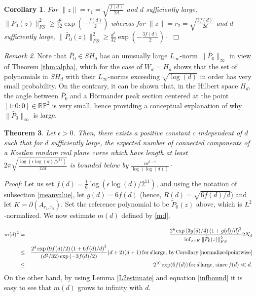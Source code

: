 \documentclass [11pt]{amsart}
\newtheorem {theorem}{Theorem}
\newtheorem {corollary}[theorem]{Corollary}
\theoremstyle{remark}
\newtheorem {remark}[theorem]{Remark}
\numberwithin{equation}{section}
\numberwithin{theorem}{section}
\begin{document}
\begin{corollary} \label{normalizedpointwise}
For $\displaystyle{\|z\|=r_{1}=\sqrt{\frac{f(d)}{2d}}}$ and $d$ sufficiently large,  
\( \displaystyle{\|\widetilde{P_{0}}(z)\|_{FS}^2 \geq \frac{d^{2}}{32}\exp\left(  -\frac{f(d)}{2}\right)}\)
whereas for $\displaystyle{ \|z\|=r_{2}= \sqrt{\frac{3f(d)}{2d}}}$  and $d$ sufficiently large, 
\(\displaystyle{ \|\widetilde{P_{0}}(z)\|_{FS}^2 \geq \frac{d^{2}}{32}\exp\left(  -\frac{3f(d)}{2}\right)\cdot}\) 
\hfill $\Box$
\end{corollary}
\begin{remark}
Note that $\widetilde{P_{0}}\in SH_{d}$ has an unusually large $L_{\infty}$-norm $\|\widetilde{P_{0}}\|_{\infty}$ in view of Theorem \ref{thm:alpha}, which for the case of $W_{d}=H_{d}$ shows that the set of polynomials in $SH_{d}$ with their $L_{\infty}$-norms exceeding $\sqrt{\log(d)}$ in order has very small probability.  On the contrary, it can be shown that, in the Hilbert space $H_{d}$, the angle between $\widetilde{P_{0}}$ and a Hörmander peak section centered at the point $[1:0:0]\in \mathbb{RP}^2$  is very small, hence providing a conceptual explanation of why $\|\widetilde{P_{0}}\|_{\infty}$ is large.  
\end{remark}

\begin{theorem} \label{largecomponents}
Let $\epsilon>0$. Then, there exists a positive constant $c$ independent of $d$ such that for $d$ sufficiently large,  the expected number of connected components of a Kostlan random real plane curve which have length at least $\displaystyle{2\pi\sqrt{\frac{\log\left(\epsilon \log(d)/2^{11}\right)}{12d}}}$ is bounded below by $\displaystyle{\frac{cd^{1-\epsilon}}{\log(\log(d))}\cdot}$
\end{theorem} 

\noindent\textit{Proof:} Let us set $\displaystyle{f(d)=\frac{1}{6}\log(\epsilon \log(d)/2^{11})}$, and using the notation of subsection \ref{meanvalue}, let $g(d)=6f(d)$ (hence, $\displaystyle{R(d)=\sqrt{6f(d)/d}}$) and let $K=\partial(A_{r_{1},r_{2}})$. Set the reference polynomial to be $\widetilde{P}_{0}(z)$ above, which is $L^2$-normalized. We now estimate $m(d)$ defined by \eqref{md}. 

\begin{eqnarray*} 
m(d)^2&=&  \frac{2^4  \exp\left(3g(d)/4\right) \left(1+g(d)/d\right)^3 }{\inf_{z\in K}  \|\widetilde{P}_{0}(z)\|^2_{FS} }2N_{d}    \\
&\leq&  \frac{2^4  \exp\left(9f(d)/2\right) \left(1+6f(d)/d\right)^3 }{(d^{2}/32)\exp\left(  -3f(d)/2\right) }(d+2)(d+1) \, \mathrm{for} \, d \, \mathrm{large},\, \mathrm{by} \, \mathrm{Corollary} \, \ref{normalizedpointwise}       \\
&\leq& 2^{10}\exp(6f(d)) \, \mathrm{for} \, d \, \mathrm{large},\, \mathrm{since} \, f(d)\ll d. 
\end{eqnarray*}
\noindent On the other hand, by using Lemma \ref{L2estimate} and equation \eqref{infbound} it is easy to see that $m(d)$ grows to infinity with $d$. 
\end{document}
